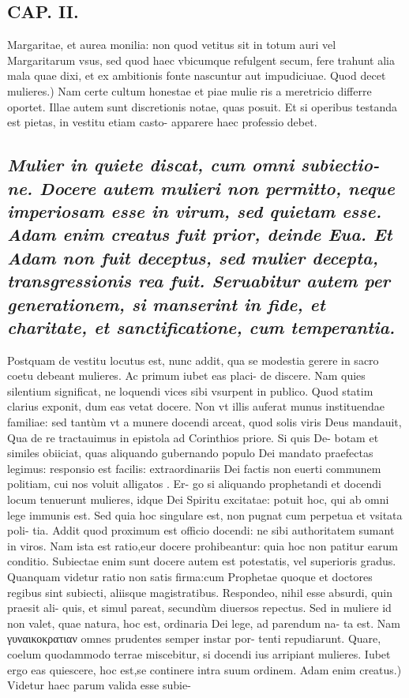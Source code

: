 \documentclass{article}
\begin{document}
\begin{pages}
\section*{CAP. II. }
\marginpar{[ p.27 ]}\pstart Margaritae, et aurea monilia: non quod vetitus sit in totum auri vel Margaritarum vsus, sed quod haec vbicumque refulgent secum, fere trahunt alia mala quae dixi, et ex ambitionis fonte nascuntur aut impudiciuae.  \pend\pstart Quod decet mulieres.) Nam certe cultum honestae et piae mulie ris a meretricio differre oportet. Illae autem sunt discretionis notae, quas posuit. Et si operibus testanda est pietas, in vestitu etiam casto- apparere haec professio debet.  \pend
{}
{}
\subsection*{\textit{Mulier in quiete discat, cum omni subiectio- ne. Docere autem mulieri non permitto, neque imperiosam esse in virum, sed quietam esse. Adam enim creatus fuit prior, deinde Eua. Et Adam non fuit deceptus, sed mulier decepta, transgressionis rea fuit. Seruabitur autem per generationem, si manserint in fide, et charitate, et sanctificatione, cum temperantia. }}\pstart Postquam de vestitu locutus est, nunc addit, qua se modestia gerere in sacro coetu debeant mulieres. Ac primum iubet eas placi- de discere. Nam quies silentium significat, ne loquendi vices sibi vsurpent in publico. Quod statim clarius exponit, dum eas vetat docere. Non vt illis auferat munus instituendae familiae: sed tantùm vt a munere docendi arceat, quod solis viris Deus mandauit, Qua de re tractauimus in epistola ad Corinthios priore. Si quis De- botam et similes obiiciat, quas aliquando gubernando populo Dei mandato praefectas legimus: responsio est facilis: extraordinariis Dei factis non euerti communem politiam, cui nos voluit alligatos . Er- go si aliquando prophetandi et docendi locum tenuerunt mulieres, idque Dei Spiritu excitatae: potuit hoc, qui ab omni lege immunis est. Sed quia hoc singulare est, non pugnat cum perpetua et vsitata poli- tia. Addit quod proximum est officio docendi: ne sibi authoritatem sumant in viros. Nam ista est ratio,eur docere prohibeantur: quia hoc non patitur earum conditio. Subiectae enim sunt docere autem est potestatis, vel superioris gradus. Quanquam videtur ratio non satis firma:cum Prophetae quoque et doctores regibus sint subiecti, aliisque magistratibus. Respondeo, nihil esse absurdi, quin praesit ali- quis, et simul pareat, secundùm diuersos repectus. Sed in muliere id non valet, quae natura, hoc est, ordinaria Dei lege, ad parendum na- ta est. Nam γυναικοκρατιαν omnes prudentes semper instar por- tenti repudiarunt. Quare, coelum quodammodo terrae miscebitur, si docendi ius arripiant mulieres. Iubet ergo eas quiescere, hoc est,se continere intra suum ordinem.  \pend\pstart Adam enim creatus.) Videtur haec parum valida esse subie-  \pend

\end{pages}
\end{document}
